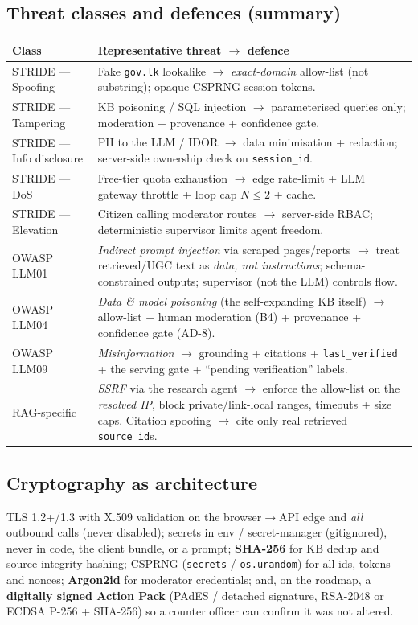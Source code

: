 \documentclass[11pt,a4paper]{article}
\begin{document}
\subsection{Threat classes and defences (summary)}
\begin{center}
\footnotesize
\begin{tabularx}{\linewidth}{@{}l Y@{}}
\toprule
\textbf{Class} & \textbf{Representative threat $\to$ defence} \\
\midrule
STRIDE --- Spoofing & Fake \texttt{gov.lk} lookalike $\to$ \emph{exact-domain} allow-list (not
substring); opaque CSPRNG session tokens. \\
STRIDE --- Tampering & KB poisoning / SQL injection $\to$ parameterised queries only; moderation +
provenance + confidence gate. \\
STRIDE --- Info disclosure & PII to the LLM / IDOR $\to$ data minimisation + redaction; server-side
ownership check on \texttt{session\_id}. \\
STRIDE --- DoS & Free-tier quota exhaustion $\to$ edge rate-limit + LLM gateway throttle + loop cap
$N\le2$ + cache. \\
STRIDE --- Elevation & Citizen calling moderator routes $\to$ server-side RBAC; deterministic
supervisor limits agent freedom. \\
OWASP LLM01 & \emph{Indirect prompt injection} via scraped pages/reports $\to$ treat retrieved/UGC
text as \emph{data, not instructions}; schema-constrained outputs; supervisor (not the LLM) controls
flow. \\
OWASP LLM04 & \emph{Data \& model poisoning} (the self-expanding KB itself) $\to$ allow-list + human
moderation (B4) + provenance + confidence gate (AD-8). \\
OWASP LLM09 & \emph{Misinformation} $\to$ grounding + citations + \texttt{last\_verified} + the
serving gate + ``pending verification'' labels. \\
RAG-specific & \emph{SSRF} via the research agent $\to$ enforce the allow-list on the \emph{resolved
IP}, block private/link-local ranges, timeouts + size caps. Citation spoofing $\to$ cite only real
retrieved \texttt{source\_id}s. \\
\bottomrule
\end{tabularx}
\end{center}

\subsection{Cryptography as architecture}
TLS 1.2+/1.3 with X.509 validation on the browser$\to$API edge and \emph{all} outbound calls (never
disabled); secrets in env / secret-manager (gitignored), never in code, the client bundle, or a
prompt; \textbf{SHA-256} for KB dedup and source-integrity hashing; CSPRNG (\texttt{secrets} /
\texttt{os.urandom}) for all ids, tokens and nonces; \textbf{Argon2id} for moderator credentials; and,
on the roadmap, a \textbf{digitally signed Action Pack} (PAdES / detached signature, RSA-2048 or ECDSA
P-256 + SHA-256) so a counter officer can confirm it was not altered.
\end{document}
